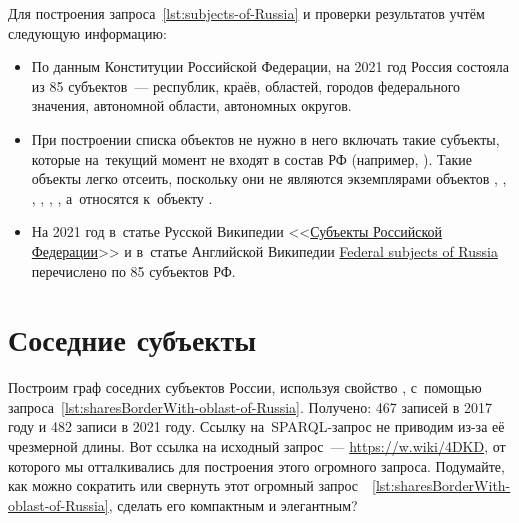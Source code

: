 Для построения запроса~\ref{lst:subjects-of-Russia} и проверки результатов учтём следующую информацию:
\begin{itemize}
  \item По данным Конституции Российской Федерации, на 2021 год Россия состояла из 85 субъектов~--- республик, краёв, областей, городов федерального значения, автономной области, автономных округов.
  \item При построении списка объектов не нужно в него включать такие субъекты, 
      которые на~текущий момент не входят в состав РФ (например, ). 
      Такие объекты легко отсеить, поскольку 
        они не являются экземплярами объектов , 
        , 
        , 
        , 
        , 
        , 
      а~относятся к~объекту . 
  \item На 2021 год в~статье Русской Википедии <<\href{https://ru.wikipedia.org/?curid=1042}{Субъекты Российской Федерации}>> 
        и в~статье Английской Википедии 
        \href{https://en.wikipedia.org/wiki/Federal_subjects_of_Russia}{Federal subjects of Russia} 
        перечислено по 85 субъектов РФ.
\end{itemize}





\section{Соседние субъекты}

Построим граф соседних субъектов России, используя свойство , 
с~помощью запроса~\ref{lst:sharesBorderWith-oblast-of-Russia}.
Получено: 467 записей в 2017 году 
и 482 записи в 2021 году. Ссылку на~SPARQL-запрос не приводим из-за её чрезмерной длины. 
Вот ссылка на исходный запрос~--- \url{https://w.wiki/4DKD}, 
от которого мы отталкивались для построения этого огромного запроса. 
Подумайте, как можно сократить или свернуть 
этот огромный запрос~~\ref{lst:sharesBorderWith-oblast-of-Russia}, 
сделать его компактным и элегантным?

